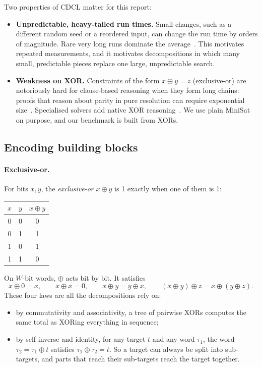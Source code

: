 \documentclass[11pt,a4paper]{article}
\begin{document}
Two properties of CDCL matter for this report:
\begin{itemize}
\item \textbf{Unpredictable, heavy-tailed run times.} Small changes, such as a different
      random seed or a reordered input, can change the run time by orders of magnitude.
      Rare very long runs dominate the average~\cite{gomes2000heavy}. This motivates
      repeated measurements, and it motivates decompositions in which many small,
      predictable pieces replace one large, unpredictable search.
\item \textbf{Weakness on XOR.} Constraints of the form $x\oplus y = z$ (exclusive-or) are
      notoriously hard for clause-based reasoning when they form long chains: proofs that
      reason about parity in pure resolution can require exponential
      size~\cite{urquhart1987hard}. Specialised solvers add native XOR
      reasoning~\cite{soos2009crypto}. We use plain MiniSat on purpose, and our benchmark
      is built from XORs.
\end{itemize}

\subsection{Encoding building blocks}
\label{sec:encodings}
\paragraph{Exclusive-or.}
For bits $x,y$, the \emph{exclusive-or} $x\oplus y$ is 1 exactly when one of them is 1:
\begin{center}\small
\begin{tabular}{@{}cc|c@{}}
$x$ & $y$ & $x\oplus y$\\\midrule
0&0&0\\ 0&1&1\\ 1&0&1\\ 1&1&0
\end{tabular}
\end{center}
On $W$-bit words, $\oplus$ acts bit by bit. It satisfies
\begin{equation}
x\oplus 0 = x,\qquad x\oplus x = 0,\qquad x\oplus y = y\oplus x,\qquad (x\oplus y)\oplus z = x\oplus(y\oplus z).
\label{eq:xorlaws}
\end{equation}
These four laws are all the decompositions rely on:
\begin{itemize}
\item by commutativity and associativity, a tree of pairwise XORs computes the same total as
      XORing everything in sequence;
\item by self-inverse and identity, for any target $t$ and any word $\tau_1$, the word
      $\tau_2=\tau_1\oplus t$ satisfies $\tau_1\oplus\tau_2=t$. So a target can always be
      split into sub-targets, and parts that reach their sub-targets reach the target
      together.
\end{itemize}
\end{document}
